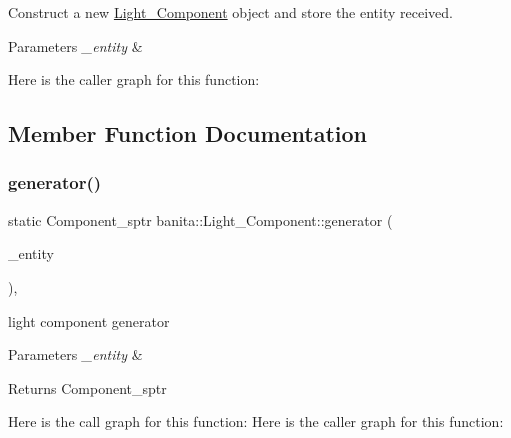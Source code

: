 Construct a new \mbox{\hyperlink{classbanita_1_1_light___component}{Light\+\_\+\+Component}} object and store the entity received. 


\begin{DoxyParams}{Parameters}
{\em \+\_\+entity} & \\
\hline
\end{DoxyParams}
Here is the caller graph for this function\+:


\subsection{Member Function Documentation}
\mbox{\label{classbanita_1_1_light___component_acc13089b837daf1b1751c3dca81fa798}} 
\subsubsection{\texorpdfstring{generator()}{generator()}}
{\footnotesize\ttfamily static Component\+\_\+sptr banita\+::\+Light\+\_\+\+Component\+::generator (\begin{DoxyParamCaption}\item[{\mbox{\hyperlink{classbanita_1_1_entity}{Entity}} $\ast$}]{\+\_\+entity }\end{DoxyParamCaption})\hspace{0.3cm}{\ttfamily [inline]}, {\ttfamily [static]}}



light component generator 


\begin{DoxyParams}{Parameters}
{\em \+\_\+entity} & \\
\hline
\end{DoxyParams}
\begin{DoxyReturn}{Returns}
Component\+\_\+sptr 
\end{DoxyReturn}
Here is the call graph for this function\+:
Here is the caller graph for this function\+:
\mbox{\label{classbanita_1_1_light___component_a4de1a5438ce5f15ecd46544bf27b4d6e}} 
